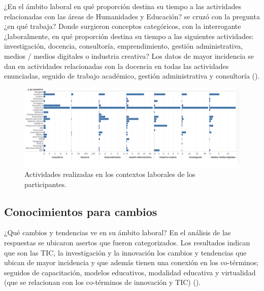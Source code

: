 \documentclass[spanish]{textolivre}
\begin{document}
¿En el ámbito laboral en qué proporción destina su tiempo a las actividades relacionadas con las áreas de Humanidades y Educación? se cruzó con la pregunta ¿en qué trabaja? Donde surgieron conceptos categóricos, con la interrogante ¿laboralmente, en qué proporción destina su tiempo a las siguientes actividades: investigación, docencia, consultoría, emprendimiento, gestión administrativa, medios / medios digitales o industria creativa? Los datos de mayor incidencia se dan en actividades relacionadas con la docencia en todas las actividades enunciadas, seguido de trabajo académico, gestión administrativa y consultoría ().

\begin{figure}[htbp]
 \hspace*{-1.3in}
 \includegraphics[width=1.22\textwidth]{Fig5.png}
 \caption{Actividades realizadas en los contextos laborales de los participantes.}
 \label{fig5}
\end{figure}

\subsection{Conocimientos para cambios}\label{sec-resumo}
¿Qué cambios y tendencias ve en su ámbito laboral? En el análisis de las respuestas se ubicaron asertos que fueron categorizados. Los resultados indican que son las TIC, la investigación y la innovación los cambios y tendencias que ubican de mayor incidencia y que además tienen una conexión en los co-términos; seguidos de capacitación, modelos educativos, modalidad educativa y virtualidad (que se relacionan con los co-términos de innovación y TIC) ().
\end{document}
